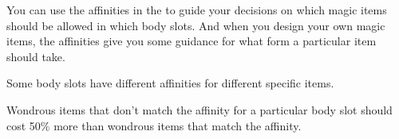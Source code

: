 You can use the affinities in the  to guide your decisions on which magic items should be allowed in which body slots. And when you design your own magic items, the affinities give you some guidance for what form a particular item should take.

Some body slots have different affinities for different specific items.

Wondrous items that don't match the affinity for a particular body slot should cost 50\% more than wondrous items that match the affinity.

